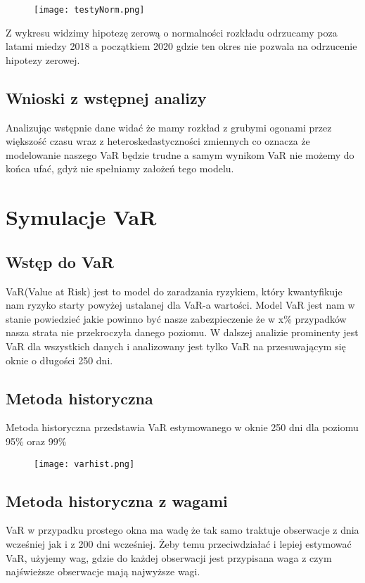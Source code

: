 \documentclass[]{article}
\begin{document}
	\begin{figure}[h!]
		\centering
		\texttt{[image: testyNorm.png]}
		\caption{}
		\label{fig:testynorm}
	\end{figure}
	
	Z wykresu widzimy hipotezę zerową o normalności rozkładu odrzucamy poza latami miedzy 2018 a początkiem 2020 gdzie ten okres nie pozwala na odrzucenie hipotezy zerowej. 
	
	
	
	\subsection{Wnioski z wstępnej analizy}
	Analizując wstępnie dane widać że mamy rozkład z grubymi ogonami przez większość czasu wraz z heteroskedastyczności zmiennych co oznacza że modelowanie naszego VaR będzie trudne a samym wynikom VaR nie możemy do końca ufać, gdyż nie spełniamy założeń tego modelu. 

\section{Symulacje VaR}
	\subsection{Wstęp do VaR }
	VaR(Value at Risk) jest to model do zaradzania ryzykiem, który kwantyfikuje nam ryzyko starty powyżej ustalanej dla VaR-a wartości. Model VaR jest nam w stanie powiedzieć jakie powinno być nasze zabezpieczenie że w x\% przypadków nasza strata nie przekroczyła danego poziomu. W dalszej analizie prominenty jest VaR dla wszystkich danych i analizowany jest tylko VaR na przesuwającym się oknie o długości 250 dni. 
	
	\subsection{Metoda historyczna}
	Metoda historyczna przedstawia VaR estymowanego w oknie 250 dni dla poziomu 95\% oraz 99\%
	\begin{figure}[h!]
		\centering
		\texttt{[image: varhist.png]}
		\caption{}
		\label{fig:varhist}
	\end{figure}
	
	
	\subsection{Metoda historyczna z wagami}
	VaR w przypadku prostego okna ma wadę że tak samo traktuje obserwacje z dnia wcześniej jak i z 200 dni wcześniej. Żeby temu przeciwdziałać i lepiej estymować VaR, użyjemy wag, gdzie do każdej obserwacji jest przypisana waga z czym najświeższe obserwacje mają najwyższe wagi. 
	
\end{document}

